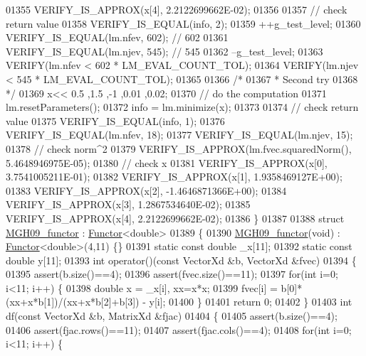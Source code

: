 \begin{DoxyCode}
01355   VERIFY\_IS\_APPROX(x[4], 2.2122699662E-02);
01356   
01357   \textcolor{comment}{// check return value}
01358   VERIFY\_IS\_EQUAL(info, 2); 
01359   ++g\_test\_level;
01360   VERIFY\_IS\_EQUAL(lm.nfev, 602);  \textcolor{comment}{// 602}
01361   VERIFY\_IS\_EQUAL(lm.njev, 545);  \textcolor{comment}{// 545}
01362   --g\_test\_level;
01363   VERIFY(lm.nfev < 602 * LM\_EVAL\_COUNT\_TOL);
01364   VERIFY(lm.njev < 545 * LM\_EVAL\_COUNT\_TOL);
01365 
01366   \textcolor{comment}{/*}
01367 \textcolor{comment}{   * Second try}
01368 \textcolor{comment}{   */}
01369   x<< 0.5  ,1.5  ,-1   ,0.01 ,0.02;
01370   \textcolor{comment}{// do the computation}
01371   lm.resetParameters();
01372   info = lm.minimize(x);
01373 
01374   \textcolor{comment}{// check return value}
01375   VERIFY\_IS\_EQUAL(info, 1);
01376   VERIFY\_IS\_EQUAL(lm.nfev, 18);
01377   VERIFY\_IS\_EQUAL(lm.njev, 15);
01378   \textcolor{comment}{// check norm^2}
01379   VERIFY\_IS\_APPROX(lm.fvec.squaredNorm(), 5.4648946975E-05);
01380   \textcolor{comment}{// check x}
01381   VERIFY\_IS\_APPROX(x[0], 3.7541005211E-01);
01382   VERIFY\_IS\_APPROX(x[1], 1.9358469127E+00);
01383   VERIFY\_IS\_APPROX(x[2], -1.4646871366E+00);
01384   VERIFY\_IS\_APPROX(x[3], 1.2867534640E-02);
01385   VERIFY\_IS\_APPROX(x[4], 2.2122699662E-02);
01386 \}
01387 
01388 \textcolor{keyword}{struct }\hyperlink{struct_m_g_h09__functor}{MGH09\_functor} : \hyperlink{struct_functor}{Functor}<double>
01389 \{
01390     \hyperlink{struct_m_g_h09__functor}{MGH09\_functor}(\textcolor{keywordtype}{void}) : \hyperlink{struct_functor}{Functor}<double>(4,11) \{\}
01391     \textcolor{keyword}{static} \textcolor{keyword}{const} \textcolor{keywordtype}{double} \_x[11];
01392     \textcolor{keyword}{static} \textcolor{keyword}{const} \textcolor{keywordtype}{double} y[11];
01393     \textcolor{keywordtype}{int} operator()(\textcolor{keyword}{const} VectorXd &b, VectorXd &fvec)
01394     \{
01395         assert(b.size()==4);
01396         assert(fvec.size()==11);
01397         \textcolor{keywordflow}{for}(\textcolor{keywordtype}{int} i=0; i<11; i++) \{
01398             \textcolor{keywordtype}{double} x = \_x[i], xx=x*x;
01399             fvec[i] = b[0]*(xx+x*b[1])/(xx+x*b[2]+b[3]) - y[i];
01400         \}
01401         \textcolor{keywordflow}{return} 0;
01402     \}
01403     \textcolor{keywordtype}{int} df(\textcolor{keyword}{const} VectorXd &b, MatrixXd &fjac)
01404     \{
01405         assert(b.size()==4);
01406         assert(fjac.rows()==11);
01407         assert(fjac.cols()==4);
01408         \textcolor{keywordflow}{for}(\textcolor{keywordtype}{int} i=0; i<11; i++) \{

\end{DoxyCode}
